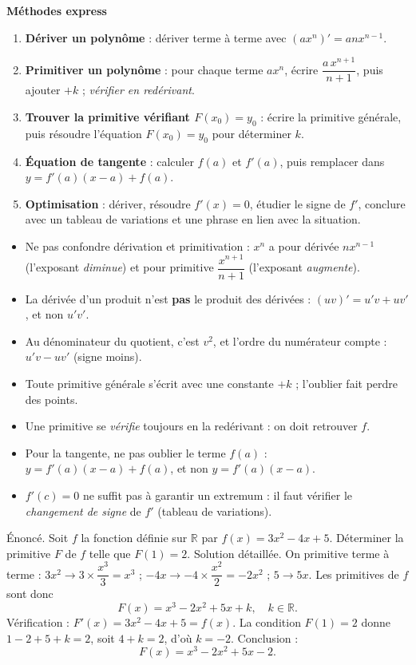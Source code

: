 \documentclass[11pt]{article}
\begin{document}
\begin{aretenir}
\textbf{Méthodes express}
\begin{enumerate}
  \item \textbf{Dériver un polynôme} : dériver terme à terme avec $(ax^{n})'=anx^{n-1}$.
  \item \textbf{Primitiver un polynôme} : pour chaque terme $ax^{n}$, écrire $\dfrac{a\,x^{n+1}}{n+1}$, puis ajouter $+k$ ; \emph{vérifier en redérivant}.
  \item \textbf{Trouver la primitive vérifiant $F(x_{0})=y_{0}$} : écrire la primitive générale, puis résoudre l'équation $F(x_{0})=y_{0}$ pour déterminer $k$.
  \item \textbf{Équation de tangente} : calculer $f(a)$ et $f'(a)$, puis remplacer dans $y=f'(a)(x-a)+f(a)$.
  \item \textbf{Optimisation} : dériver, résoudre $f'(x)=0$, étudier le signe de $f'$, conclure avec un tableau de variations et une phrase en lien avec la situation.
\end{enumerate}
\end{aretenir}

\begin{attention}
\begin{itemize}
  \item Ne pas confondre dérivation et primitivation : $x^{n}$ a pour dérivée $nx^{n-1}$ (l'exposant \emph{diminue}) et pour primitive $\dfrac{x^{n+1}}{n+1}$ (l'exposant \emph{augmente}).
  \item La dérivée d'un produit n'est \textbf{pas} le produit des dérivées : $(uv)'=u'v+uv'$, et non $u'v'$.
  \item Au dénominateur du quotient, c'est $v^{2}$, et l'ordre du numérateur compte : $u'v-uv'$ (signe moins).
  \item Toute primitive générale s'écrit avec une constante $+k$ ; l'oublier fait perdre des points.
  \item Une primitive se \emph{vérifie} toujours en la redérivant : on doit retrouver $f$.
  \item Pour la tangente, ne pas oublier le terme $f(a)$ : $y=f'(a)(x-a)+f(a)$, et non $y=f'(a)(x-a)$.
  \item $f'(c)=0$ ne suffit pas à garantir un extremum : il faut vérifier le \emph{changement de signe} de $f'$ (tableau de variations).
\end{itemize}
\end{attention}

\begin{exoresolu}
Énoncé. Soit $f$ la fonction définie sur $\mathbb{R}$ par $f(x)=3x^{2}-4x+5$. Déterminer la primitive $F$ de $f$ telle que $F(1)=2$.
\tcblower
Solution détaillée. On primitive terme à terme : $3x^{2}\to 3\times\dfrac{x^{3}}{3}=x^{3}$ ; $-4x\to -4\times\dfrac{x^{2}}{2}=-2x^{2}$ ; $5\to 5x$. Les primitives de $f$ sont donc
\[ F(x)=x^{3}-2x^{2}+5x+k,\quad k\in\mathbb{R}. \]
Vérification : $F'(x)=3x^{2}-4x+5=f(x)$. La condition $F(1)=2$ donne $1-2+5+k=2$, soit $4+k=2$, d'où $k=-2$. Conclusion :
\[ F(x)=x^{3}-2x^{2}+5x-2. \]
\end{exoresolu}
\end{document}
